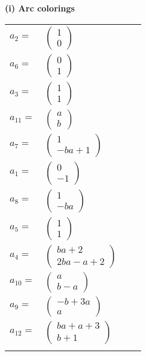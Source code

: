 \documentclass[1p]{elsarticle_modified}
\theoremstyle{definition}
\begin{document}
\flushleft \textbf{(i) Arc colorings}\\
\begin{tabular}{m{7pt} m{180pt} m{7pt} m{180pt} }
\flushright $a_{2}=$&$\begin{pmatrix}1\\0\end{pmatrix}$ \\
\flushright $a_{6}=$&$\begin{pmatrix}0\\1\end{pmatrix}$ \\
\flushright $a_{3}=$&$\begin{pmatrix}1\\1\end{pmatrix}$ \\
\flushright $a_{11}=$&$\begin{pmatrix}a\\b\end{pmatrix}$ \\
\flushright $a_{7}=$&$\begin{pmatrix}1\\- b a+1\end{pmatrix}$ \\
\flushright $a_{1}=$&$\begin{pmatrix}0\\-1\end{pmatrix}$ \\
\flushright $a_{8}=$&$\begin{pmatrix}1\\- b a\end{pmatrix}$ \\
\flushright $a_{5}=$&$\begin{pmatrix}1\\1\end{pmatrix}$ \\
\flushright $a_{4}=$&$\begin{pmatrix}b a+2\\2 b a- a+2\end{pmatrix}$ \\
\flushright $a_{10}=$&$\begin{pmatrix}a\\b- a\end{pmatrix}$ \\
\flushright $a_{9}=$&$\begin{pmatrix}- b+3 a\\a\end{pmatrix}$ \\
\flushright $a_{12}=$&$\begin{pmatrix}b a+a+3\\b+1\end{pmatrix}$\\&\end{tabular}
\end{document}
